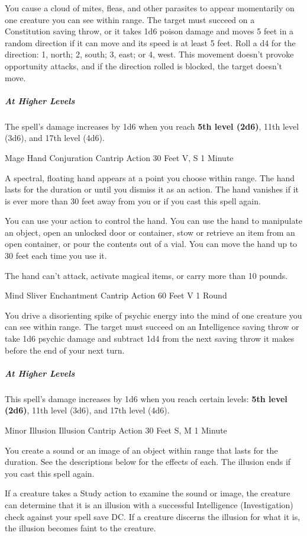 \documentclass[letterpaper,openany,oneside,twocolumn]{book}
\begin{document}
You cause a cloud of mites, fleas, and other parasites to appear momentarily on one creature you can see within range. The target must succeed on a Constitution saving throw, or it takes 1d6 poison damage and moves 5 feet in a random direction if it can move and its speed is at least 5 feet. Roll a d4 for the direction: 1, north; 2, south; 3, east; or 4, west. This movement doesn't provoke opportunity attacks, and if the direction rolled is blocked, the target doesn't move.

\subparagraph*{At Higher Levels} The spell's damage increases by 1d6 when you reach \textbf{5th level (2d6)}, 11th level (3d6), and 17th level (4d6).

\DndSpellHeader
  {Mage Hand}
  {Conjuration Cantrip}
  {Action}
  {30 Feet}
  {V, S}
  {1 Minute}

A spectral, floating hand appears at a point you choose within range. The hand lasts for the duration or until you dismiss it as an action. The hand vanishes if it is ever more than 30 feet away from you or if you cast this spell again.

You can use your action to control the hand. You can use the hand to manipulate an object, open an unlocked door or container, stow or retrieve an item from an open container, or pour the contents out of a vial. You can move the hand up to 30 feet each time you use it.

The hand can't attack, activate magical items, or carry more than 10 pounds.

\DndSpellHeader
  {Mind Sliver}
  {Enchantment Cantrip}
  {Action}
  {60 Feet}
  {V}
  {1 Round}

You drive a disorienting spike of psychic energy into the mind of one creature you can see within range. The target must succeed on an Intelligence saving throw or take 1d6 psychic damage and subtract 1d4 from the next saving throw it makes before the end of your next turn.

\subparagraph*{At Higher Levels} This spell's damage increases by 1d6 when you reach certain levels: \textbf{5th level (2d6)}, 11th level (3d6), and 17th level (4d6).

\DndSpellHeader
  {Minor Illusion}
  {Illusion Cantrip}
  {Action}
  {30 Feet}
  {S, M}
  {1 Minute}

You create a sound or an image of an object within range that lasts for the duration. See the descriptions below for the effects of each. The illusion ends if you cast this spell again.

If a creature takes a Study action to examine the sound or image, the creature can determine that it is an illusion with a successful Intelligence (Investigation) check against your spell save DC. If a creature discerns the illusion for what it is, the illusion becomes faint to the creature.
\end{document}
